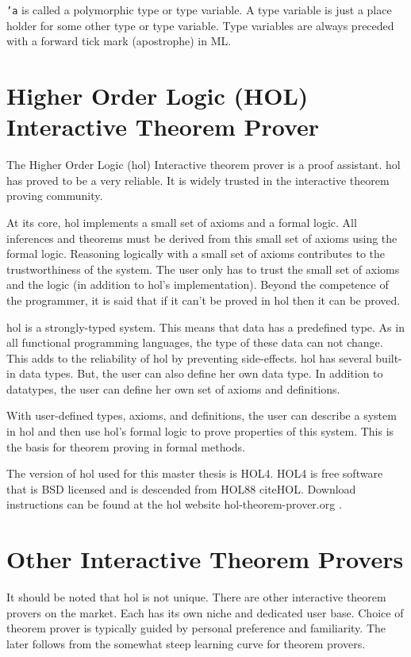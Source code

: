 \documentclass[../../main/main.tex]{subfiles}
\begin{document}
\texttt{'a} is called a polymorphic type or type variable.  A type variable is just a place holder for some other type or type variable.  Type variables are always preceded with a forward tick mark (apostrophe) in ML.


\section{Higher Order Logic (HOL) Interactive Theorem Prover}\label{app:hol}
The Higher Order Logic (\gls{hol}) Interactive theorem prover is a proof assistant.  \gls{hol} has proved to be a very reliable.  It is widely trusted in the interactive theorem proving community.

At its core, \gls{hol} implements a small set of axioms and a formal logic.  All inferences and theorems must be derived from this small set of axioms using the formal logic.  Reasoning logically with a small set of axioms contributes to the trustworthiness of the system.  The user only has to trust the small set of axioms and the logic (in addition to \gls{hol}'s implementation).  Beyond the competence of the programmer, it is said that if it can't be proved in \gls{hol} then it can be proved.  

\gls{hol} is a strongly-typed system.  This means that data has a predefined type.  As in all functional programming languages, the type of these data can not change.  This adds to the reliability of \gls{hol} by preventing side-effects. \gls{hol} has several built-in data types.  But, the user can also define her own data type.   In addition to datatypes, the user can define her own set of axioms and definitions.  

With user-defined types, axioms, and definitions, the user can describe a system in \gls{hol} and then use \gls{hol}'s formal logic to prove properties of this system.  This is the basis for theorem proving in formal methods.

The version of \gls{hol} used for this master thesis is HOL4.  HOL4 is free software that is BSD licensed \cite{BSDlicenses} and is descended from HOL88 cite{HOL}.  Download instructions can be found at the \gls{hol} website hol-theorem-prover.org \cite{HOL}.

\section{Other Interactive Theorem Provers}
It should be noted that \gls{hol} is not unique. There are other interactive theorem provers on the market. Each has its own niche and dedicated user base.  Choice of theorem prover is typically guided by personal preference and familiarity. The later follows from the somewhat steep learning curve for theorem provers. 
\end{document}
